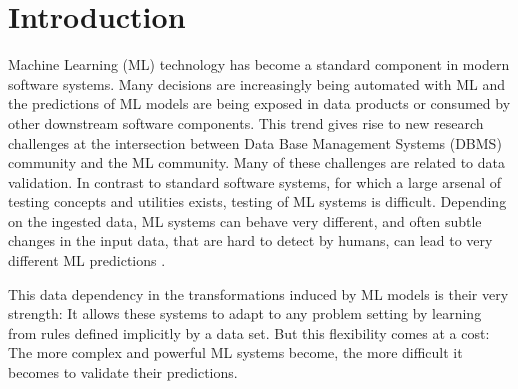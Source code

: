 \section{Introduction}
\label{sec:intro}

Machine Learning (ML) technology has become a standard component in modern software systems. Many decisions are increasingly being automated with ML and the predictions of ML models are being exposed in data products or consumed by other downstream software components. This trend gives rise to new research challenges at the intersection between Data Base Management Systems (DBMS) community and the ML community. 
%
Many of these challenges are related to data validation. In contrast to standard software systems, for which a large arsenal of testing concepts and utilities exists, testing of ML systems is difficult. Depending on the ingested data, ML systems can behave very different, and often subtle changes in the input data, that are hard to detect by humans, can lead to very different ML predictions \cite{Athalye18}. 

\newpage
This data dependency in the transformations induced by ML models is their very strength: It allows these systems to adapt to any problem setting by learning from rules defined implicitly by a data set. But this flexibility comes at a cost: The more complex and powerful ML systems become, the more difficult it becomes to validate their predictions. 

